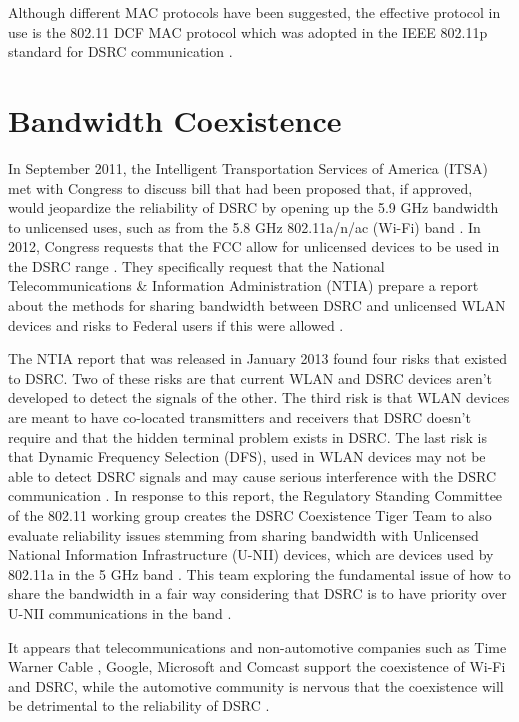 \documentclass[twoside,conference]{IEEEtran}
\begin{document}
		Although different MAC protocols have been suggested, the effective protocol in use is the 802.11 DCF MAC protocol which was adopted in the IEEE 802.11p standard for DSRC communication \cite{Hassan2011}.
		
\section{Bandwidth Coexistence}\label{sec:coexistence}
		In September 2011, the Intelligent Transportation Services of America (ITSA) met with Congress to discuss bill that had been proposed that, if approved, would jeopardize the reliability of DSRC by opening up the 5.9 GHz bandwidth to unlicensed uses, such as from the 5.8 GHz 802.11a/n/ac (Wi-Fi) band \cite{ITSA2011,Lansford2013}.  In 2012, Congress requests that the FCC allow for unlicensed devices to be used in the DSRC range \cite{ITSA2014}.  They specifically request that the National Telecommunications \& Information Administration (NTIA) prepare a report about the methods for sharing bandwidth between DSRC and unlicensed WLAN devices and risks to Federal users if this were allowed \cite{HR2012}.  
		
		The NTIA report that was released in January 2013 found four risks that existed to DSRC.  Two of these risks are that current WLAN and DSRC devices aren't developed to detect the signals of the other. The third risk is that WLAN devices are meant to have co-located transmitters and receivers that DSRC doesn't require and that the hidden terminal problem exists in DSRC. The last risk is that Dynamic Frequency Selection (DFS), used in WLAN devices may not be able to detect DSRC signals and may cause serious interference with the DSRC communication \cite[pp. 53--54]{NTIA2013}.  In response to this report, the Regulatory Standing Committee of the 802.11 working group creates the DSRC Coexistence Tiger Team to also evaluate reliability issues stemming from sharing bandwidth with Unlicensed National Information Infrastructure (U-NII) devices, which are devices used by 802.11a in the 5 GHz band \cite[p. 14]{Lansford2013}. This team exploring the fundamental issue of how to share the bandwidth in a fair way considering that DSRC is to have priority over U-NII communications in the band \cite[p. 5]{Lansford2014}.
		
		 It appears that telecommunications and non-automotive companies such as Time Warner Cable \cite[p. 13--14]{TWC2013}, Google, Microsoft \cite[p. 11]{MicrosoftGoogle2013} and Comcast \cite[p. 30]{Comcast2013} support the coexistence of Wi-Fi and DSRC, while the automotive community is nervous that the coexistence will be detrimental to the reliability of DSRC \cite[p. 16]{Toyota2013}.
		 
\end{document}
